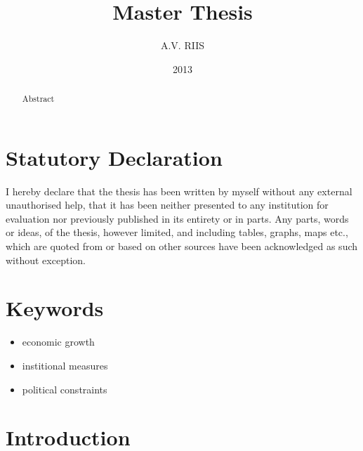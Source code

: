 \documentclass{article}\usepackage{graphicx, color}
\begin{document}
\title{Master Thesis}


\author{A.V. RIIS}


\date{2013}

\maketitle
\newpage{}


\section*{Statutory Declaration}

I hereby declare that the thesis has been written by myself without
any external unauthorised help, that it has been neither presented
to any institution for evaluation nor previously published in its
entirety or in parts. Any parts, words or ideas, of the thesis, however
limited, and including tables, graphs, maps etc., which are quoted
from or based on other sources have been acknowledged as such without
exception.

\newpage{}
\begin{abstract}
Abstract
\end{abstract}
\newpage{}


\section*{Keywords}
\begin{itemize}
\item economic growth
\item institional measures
\item political constraints
\end{itemize}
\pagebreak{}

\tableofcontents{}







\pagebreak{}


\section{Introduction}
\end{document}
